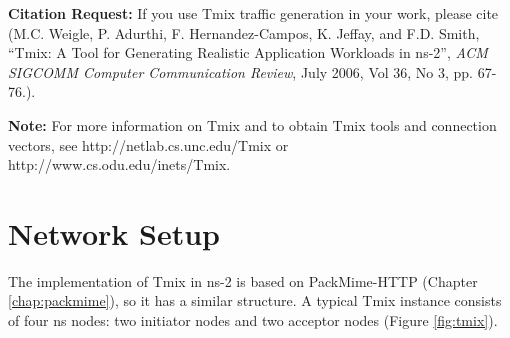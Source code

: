 \textbf{Citation Request:}  If you use Tmix traffic generation in your work, please cite \cite{weigle-ccr06} (M.C. Weigle, P. Adurthi, F. Hernandez-Campos, K. Jeffay, and F.D. Smith, ``Tmix: A Tool for Generating Realistic Application Workloads in ns-2'', \emph{ACM SIGCOMM Computer Communication Review}, July 2006, Vol 36, No 3, pp. 67-76.).

\textbf{Note:} For more information on Tmix and to obtain Tmix tools and connection vectors, see http://netlab.cs.unc.edu/Tmix or http://www.cs.odu.edu/inets/Tmix.

\section{Network Setup}

The implementation of Tmix in ns-2 is based on PackMime-HTTP (Chapter
\ref{chap:packmime}), so it has a similar structure.  A typical
Tmix instance consists of four ns nodes: two initiator nodes and two
acceptor nodes (Figure \ref{fig:tmix}).  
